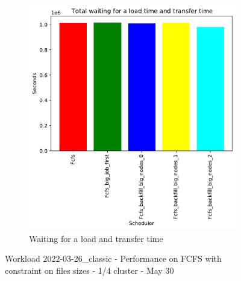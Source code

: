 \documentclass[a4paper]{article}
\begin{document}
\begin{figure}[H]
	\begin{subfigure}[b]{0.4\linewidth}\centering\includegraphics[width=1\linewidth]{MBSS/plot/Size_Constraint_2022-03-26->2022-03-26_classic_Total_waiting_for_a_load_time_and_transfer_time_95_128_4_256_1_1024.pdf}\caption{Waiting for a load and transfer time}\end{subfigure}\caption{Workload 2022-03-26\_classic - Performance on FCFS with constraint on files sizes - 1/4 cluster - May 30}\end{figure}
	
\end{document}
